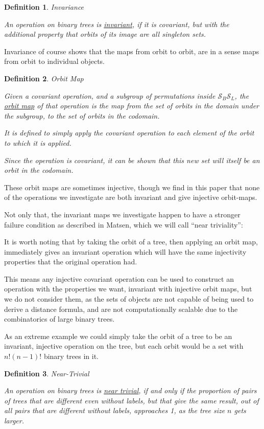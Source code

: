 \documentclass[10pt,a4paper]{report}
\newcommand{\Sym}{\mathcal{S}}
\newtheorem{definition}{Definition}
\begin{document}
\begin{definition} Invariance

	An operation on binary trees is \underline{invariant}, if it is covariant,
	but with the additional property that orbits of its image are all singleton
	sets.
\end{definition}

Invariance of course shows that the maps from orbit to orbit, are in a sense
maps from orbit to individual objects.

\begin{definition} Orbit Map

	Given a covariant operation, and a subgroup of permutations inside
	$\Sym_B\Sym_L$, the \underline{orbit map} of that operation is the map from
	the set of orbits in the domain under the subgroup, to the set of orbits in
	the codomain.

	It is defined to simply apply the covariant operation to each element of
	the orbit to which it is applied.

	Since the operation is covariant, it can be shown that this new set will
	itself be an orbit in the codomain.
\end{definition}

These orbit maps are sometimes injective, though we find in this paper that
none of the operations we investigate are both invariant and give injective
orbit-maps.

Not only that, the invariant maps we investigate happen to have a stronger
failure condition as described in Matsen, which we will call ``near
triviality'':


It is worth noting that by taking the orbit of a tree, then applying an orbit
map, immediately gives an invariant operation which will have the same
injectivity properties that the original operation had.

This means any injective covariant operation can be used to construct an
operation with the properties we want, invariant with injective orbit maps, but
we do not consider them, as the sets of objects are not capable of being used
to derive a distance formula, and are not computationally scalable due to the
combinatorics of large binary trees.

As an extreme example we could simply take the orbit of a tree to be an
invariant, injective operation on the tree, but each orbit would be a set with
$n!(n-1)!$ binary trees in it.

\begin{definition} Near-Trivial

	An operation on binary trees is \underline{near trivial}, if and only if
	the proportion of pairs of trees that are different even without labels,
	but that give the same result, out of all pairs that are different without
	labels, approaches 1, as the tree size $n$ gets larger.
\end{definition}
\end{document}

